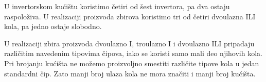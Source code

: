 
U invertorskom kućištu koristimo četiri od šest invertora, pa dva ostaju raspoloživa. U realizaciji proizvoda zbirova koristimo tri od četiri dvoulazna ILI kola, pa jedno ostaje slobodno.

U realizaciji zbira proizvoda dvoulazno I, troulazno I i dvoulazno ILI pripadaju različitim navedenim tipovima čipova, iako se koristi samo mali deo njihovih kola. Pri brojanju kućišta ne možemo proizvoljno smestiti različite tipove kola u jedan standardni čip. Zato manji broj ulaza kola ne mora značiti i manji broj kućišta.
